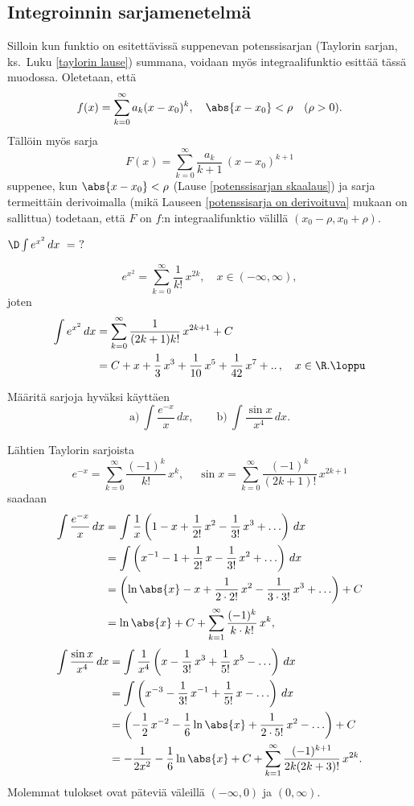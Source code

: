 \subsection*{Integroinnin sarjamenetelmä}

Silloin kun funktio on esitettävissä suppenevan potenssisarjan (Taylorin sarjan, ks.\ Luku
\ref{taylorin lause}) summana, voidaan myös integraalifunktio esittää tässä muodossa.
Oletetaan, että
\[
f(x)=\sum_{k=0}^\infty a_k(x-x_0)^k,\quad \abs{x-x_0}<\rho \quad (\rho>0).
\]
Tällöin myös sarja
\[
F(x)=\sum_{k=0}^\infty \frac{a_k}{k+1}\,(x-x_0)^{k+1}
\]
suppenee, kun $\abs{x-x_0}<\rho$ (Lause \ref{potenssisarjan skaalaus}) ja sarja termeittäin 
derivoimalla (mikä Lauseen \ref{potenssisarja on derivoituva} mukaan on sallittua) todetaan,
että
$F$ on $f$:n integraalifunktio välillä $(x_0-\rho,x_0+\rho)$.
\begin{Exa}
$\D\int e^{x^2}\, dx\ =\ ?$
\end{Exa}
\ratk
\[
e^{x^2}=\sum_{k=0}^\infty \frac{1}{k!}\,x^{2k},\quad x \in (-\infty,\infty),
\]
joten
\begin{align*}
\int e^{x^2}\, dx 
      &= \sum_{k=0}^\infty \frac{1}{(2k+1)k!}\,x^{2k+1}+C \\
      &= C+x+\frac{1}{3}\,x^3+\frac{1}{10}\,x^5+\frac{1}{42}\,x^7+..\,,\quad x\in\R. \loppu
\end{align*}
\begin{Exa} Määritä sarjoja hyväksi käyttäen
\[
\text{a)}\ \int \frac{e^{-x}}{x}\,dx, \qquad
\text{b)}\ \int \frac{\sin x}{x^4}\,dx.
\]
\end{Exa} 
\ratk Lähtien Taylorin sarjoista
\[
e^{-x} = \sum_{k=0}^\infty \frac{(-1)^k}{k!}\,x^k, \quad\
\sin x = \sum_{k=0}^\infty \frac{(-1)^k}{(2k+1)!}\,x^{2k+1}
\]
saadaan
\begin{align*}
\int\frac{e^{-x}}{x}\,dx   
  &= \int \frac{1}{x}\left(1-x+\frac{1}{2!}\,x^2-\frac{1}{3!}\,x^3+\ldots\right)\,dx \\
  &= \int \left(x^{-1}-1+\frac{1}{2!}\,x-\frac{1}{3!}\,x^2+\ldots\right)\,dx \\
  &= \left(\ln\abs{x}-x+\frac{1}{2\cdot 2!}\,x^2-\frac{1}{3\cdot 3!}\,x^3+\ldots\right) + C \\
  &= \ln\abs{x} + C + \sum_{k=1}^\infty \frac{(-1)^k}{k\cdot k!}\,x^k,
\end{align*}
\begin{align*}
\int\frac{\sin x}{x^4}\,dx 
  &= \int \frac{1}{x^4}\left(x-\frac{1}{3!}\,x^3+\frac{1}{5!}\,x^5-\ldots\right)\,dx \\ 
  &= \int \left(x^{-3}-\frac{1}{3!}\,x^{-1}+\frac{1}{5!}\,x-\ldots\right)\,dx \\
  &= \left(-\frac{1}{2}\,x^{-2}-\frac{1}{6}\ln\abs{x}
                               +\frac{1}{2\cdot 5!}\,x^2-\ldots\right) +C \\
  &= -\frac{1}{2x^2}-\frac{1}{6}\ln\abs{x}+C
                    +\sum_{k=1}^\infty \frac{(-1)^{k+1}}{2k(2k+3)!}\,x^{2k}.
\end{align*}
Molemmat tulokset ovat päteviä väleillä $(-\infty,0)$ ja $(0,\infty)$. \loppu


